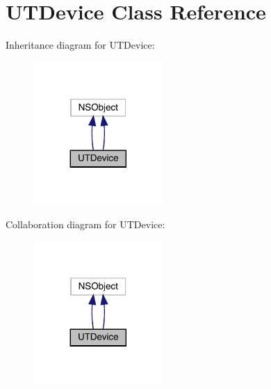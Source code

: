 \hypertarget{interface_u_t_device}{}\section{U\+T\+Device Class Reference}
\label{interface_u_t_device}


Inheritance diagram for U\+T\+Device\+:\nopagebreak
\begin{figure}[H]
\begin{center}
\leavevmode
\includegraphics[width=140pt]{interface_u_t_device__inherit__graph}
\end{center}
\end{figure}


Collaboration diagram for U\+T\+Device\+:\nopagebreak
\begin{figure}[H]
\begin{center}
\leavevmode
\includegraphics[width=140pt]{interface_u_t_device__coll__graph}
\end{center}
\end{figure}

